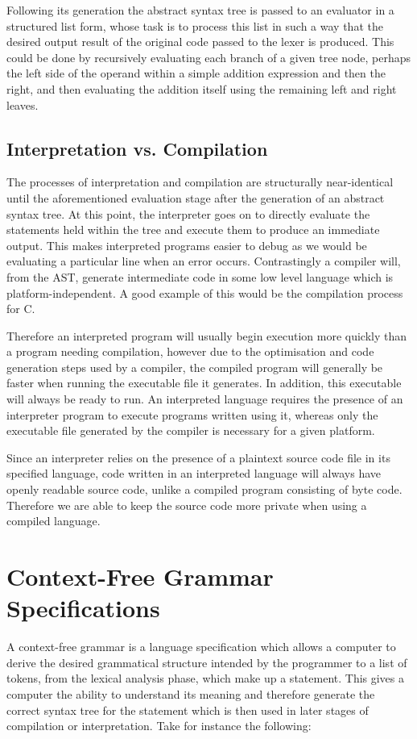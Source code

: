 \documentclass[a4paper, 11pt]{article}
\begin{document}
Following its generation the abstract syntax tree is passed to an evaluator in a structured list form, whose task is to process this list in such a way that the desired output result of the original code passed to the lexer is produced. This could be done by recursively evaluating each branch of a given tree node, perhaps the left side of the operand within a simple addition expression and then the right, and then evaluating the addition itself using the remaining left and right leaves.

\subsection{Interpretation vs. Compilation}
The processes of interpretation and compilation are structurally near-identical until the aforementioned evaluation stage after the generation of an abstract syntax tree. At this point, the interpreter goes on to directly evaluate the statements held within the tree and execute them to produce an immediate output. This makes interpreted programs easier to debug as we would be evaluating a particular line when an error occurs. Contrastingly a compiler will, from the AST, generate intermediate code in some low level language which is platform-independent. A good example of this would be the compilation process for C.

Therefore an interpreted program will usually begin execution more quickly than a program needing compilation, however due to the optimisation and code generation steps used by a compiler, the compiled program will generally be faster when running the executable file it generates. In addition, this executable will always be ready to run. An interpreted language requires the presence of an interpreter program to execute programs written using it, whereas only the executable file generated by the compiler is necessary for a given platform.

Since an interpreter relies on the presence of a plaintext source code file in its specified language, code written in an interpreted language will always have openly readable source code, unlike a compiled program consisting of byte code. Therefore we are able to keep the source code more private when using a compiled language.


\clearpage
\newpage\section{Context-Free Grammar Specifications}
A context-free grammar is a language specification which allows a computer to derive the desired grammatical structure intended by the programmer to a list of tokens, from the lexical analysis phase, which make up a statement. This gives a computer the ability to understand its meaning and therefore generate the correct syntax tree for the statement which is then used in later stages of compilation or interpretation. Take for instance the following:
\end{document}

